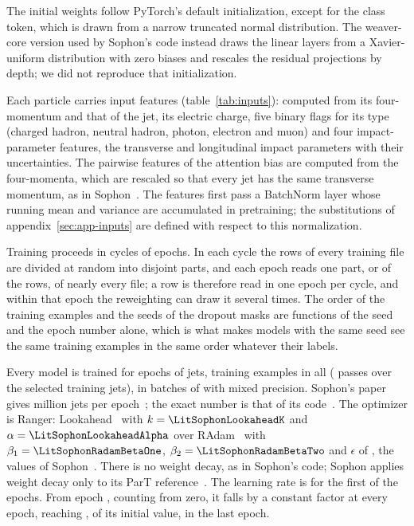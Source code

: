 The initial weights follow PyTorch's default initialization, except for the class token, which is drawn
from a narrow truncated normal distribution. The weaver-core version used by Sophon's code instead draws
the linear layers from a Xavier-uniform distribution with zero biases and rescales the residual
projections by depth; we did not reproduce that initialization.

Each particle carries \FillNFeatures{} input features (table~\ref{tab:inputs}): \FillTopNPresent{} computed from
its four-momentum and that of the jet, its electric charge, five binary flags for its type (charged hadron,
neutral hadron, photon, electron and muon) and four impact-parameter features, the transverse and
longitudinal impact parameters with their uncertainties. The pairwise features of the attention bias are
computed from the four-momenta, which are rescaled so that every jet has the same transverse momentum, as
in Sophon~\cite[Sec.~II]{sophon}. The features first pass a BatchNorm layer whose running mean and
variance are accumulated in pretraining; the substitutions of appendix~\ref{sec:app-inputs} are defined
with respect to this normalization.



Training proceeds in cycles of \DesignVtwoNWindows{} epochs. In each cycle the rows of every training
file are divided at random into \DesignVtwoNWindows{} disjoint parts, and each epoch reads one part, or
\DesignVtwoDataFraction{} of the rows, of nearly every file; a row is therefore read in one epoch per
cycle, and within that epoch the reweighting can draw it several times. The order of the training
examples and the seeds of the dropout masks are functions of the seed and the epoch number alone, which is
what makes models with the same seed see the same training examples in the same order whatever their
labels.

Every model is trained for \DesignEpochs{} epochs of \DesignSamplesPerEpoch{} jets, \DesignExamplesSeen{}
training examples in all (\DesignPassesSelected{} passes over the selected training jets), in batches of
\DesignBatchSize{} with mixed precision. Sophon's paper gives
\LitSophonSamplesPerEpochMillion{} million jets per epoch~\cite[App.~B.1]{sophon}; the exact number is
that of its code~\cite{sophoncode}. The optimizer is Ranger: Lookahead~\cite{lookahead} with
$k = \LitSophonLookaheadK$ and $\alpha = \LitSophonLookaheadAlpha$ over RAdam~\cite{radam} with
$\beta_1 = \LitSophonRadamBetaOne$, $\beta_2 = \LitSophonRadamBetaTwo$ and $\epsilon$ of
\LitSophonRadamEps, the values of Sophon~\cite[App.~B.1]{sophon}. There is no weight decay, as in
Sophon's code; Sophon applies weight decay only to its ParT reference~\cite[App.~B.3]{sophon}. The
learning rate is \DesignStartLr{} for the first \DesignLrFlatPercent{} of the epochs. From epoch
\DesignLrDecayFirstEpoch{}, counting from zero, it falls by a constant factor at every epoch, reaching
\DesignEndLr{}, \DesignLrEndPercent{} of its initial value, in the last epoch.


